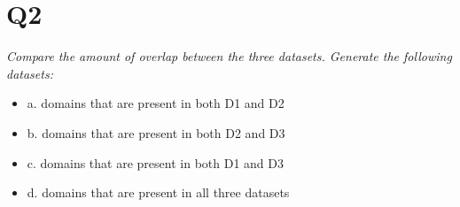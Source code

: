 \documentclass[12pt]{article}
\begin{document}
\section*{Q2}
\emph{Compare the amount of overlap between the three datasets.
Generate the following datasets:}
    \begin{itemize}
        \item a. domains that are present in both D1 and D2
        \item b. domains that are present in both D2 and D3
        \item c. domains that are present in both D1 and D3
        \item d. domains that are present in all three datasets
    \end{itemize}
\subsection*{\color{blue}{Answer}}

\end{document}
